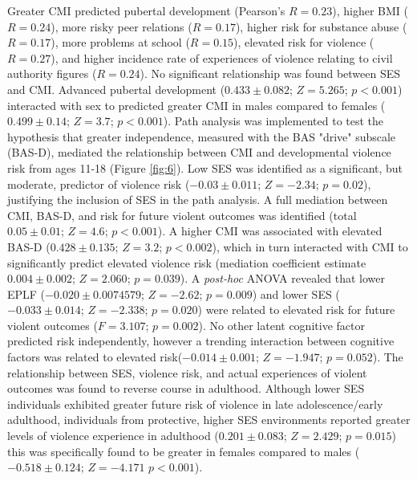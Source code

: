 \documentclass[utf8]{frontiersSCNS} %
\begin{document}
Greater CMI  predicted pubertal development (Pearson's $R=0.23$), higher BMI ($R=0.24$), more risky peer relations ($R=0.17$), higher risk for substance abuse ($R=0.17$), more problems at school ($R=0.15$), elevated risk for violence ($R=0.27$), and higher incidence rate of experiences of violence relating to civil authority figures ($R=0.24$). No significant relationship was found between SES and CMI. Advanced pubertal development ($0.433\pm0.082$; $Z=5.265$; $p<0.001$) interacted with sex to predicted greater CMI in males compared to females ($0.499\pm0.14$; $Z=3.7$; $p<0.001$). Path analysis was implemented to test the hypothesis that greater independence, measured with the BAS "drive" subscale (BAS-D), mediated the relationship between CMI and developmental violence risk from ages 11-18 (Figure \ref{fig:6}). Low SES was identified as a significant, but moderate, predictor of violence risk ($-0.03\pm0.011$; $Z=-2.34$; $p=0.02$), justifying the inclusion of SES in the path analysis. A full mediation between CMI, BAS-D, and risk for future violent outcomes was identified (total $0.05\pm0.01$; $Z=4.6$; $p<0.001$). A  higher CMI was associated with elevated BAS-D ($0.428\pm0.135$; $Z=3.2$; $p<0.002$), which in turn interacted with CMI to significantly predict elevated violence risk (mediation coefficient estimate $0.004\pm0.002$; $Z=2.060$; $p=0.039$). A \textit{post-hoc} ANOVA revealed that lower EPLF ($-0.020\pm0.0074579$; $Z=-2.62$; $p=0.009$) and lower SES ($-0.033\pm0.014$;  $Z=-2.338$;  $p=0.020$) were related to elevated risk for future violent outcomes ($F=3.107$; $p=0.002$). No other latent cognitive factor predicted risk independently, however a trending interaction between cognitive factors was related to elevated risk($-0.014\pm0.001$; $Z=-1.947$;  $p=0.052$). The relationship between SES, violence risk, and actual experiences of violent outcomes was found to reverse course in adulthood. Although lower SES individuals exhibited greater future risk of violence in late adolescence/early adulthood, individuals from protective, higher SES environments reported greater levels of violence experience in adulthood ($0.201\pm0.083$; $Z=2.429$; $p=0.015$) this was specifically found to be greater in females compared to males ($-0.518\pm0.124$;  $Z=-4.171$ $p<0.001$).
\\
\end{document}
